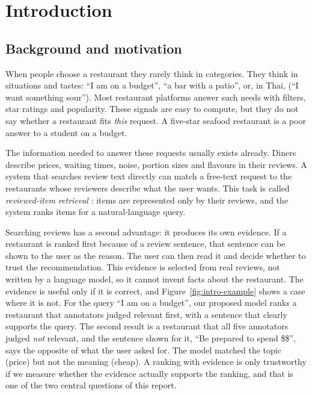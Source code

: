 \chapter{Introduction}
\label{ch:intro}

\section{Background and motivation}
When people choose a restaurant they rarely think in categories. They think in situations and
tastes: ``I am on a budget'', ``a bar with a patio'', or, in Thai, 
(``I want something sour''). Most restaurant platforms answer such needs with filters, star
ratings and popularity. These signals are easy to compute, but they do not say whether a
restaurant fits \emph{this} request. A five-star seafood restaurant is a poor answer to a
student on a budget.

The information needed to answer these requests usually exists already. Diners describe
prices, waiting times, noise, portion sizes and flavours in their reviews. A system that
searches review text directly can match a free-text request to the restaurants whose
reviewers describe what the user wants. This task is called \emph{reviewed-item retrieval}
\citep{rird2023}: items are represented only by their reviews, and the system ranks items for a
natural-language query.

Searching reviews has a second advantage: it produces its own evidence. If a restaurant is
ranked first because of a review sentence, that sentence can be shown to the user as the
reason. The user can then read it and decide whether to trust the recommendation. This
evidence is selected from real reviews, not written by a language model, so it cannot invent
facts about the restaurant. The evidence is useful only if it is correct, and
Figure~\ref{fig:intro-example} shows a case where it is not. For the query ``I am on a
budget'', our proposed model ranks a restaurant that annotators judged relevant first, with a
sentence that clearly supports the query. The second result is a restaurant that all five
annotators judged \emph{not} relevant, and the sentence shown for it, ``Be prepared to spend
\$\$'', says the opposite of what the user asked for. The model matched the topic (price) but
not the meaning (cheap). A ranking with evidence is only trustworthy if we measure whether the
evidence actually supports the ranking, and that is one of the two central questions of this
report.

